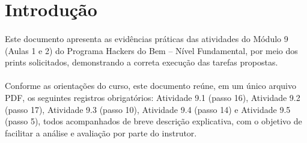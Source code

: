 \section{Introdução}

\paragraph{}
Este documento apresenta as evidências práticas das atividades do Módulo 9
(Aulas 1 e 2) do Programa Hackers do Bem -- Nível Fundamental, por meio dos
prints solicitados, demonstrando a correta execução das tarefas propostas.

\paragraph{}
Conforme as orientações do curso, este documento reúne, em um único arquivo
PDF, os seguintes registros obrigatórios: Atividade 9.1 (passo 16), Atividade
9.2 (passo 17), Atividade 9.3 (passo 10), Atividade 9.4 (passo 14) e Atividade
9.5 (passo 5), todos acompanhados de breve descrição explicativa, com o
objetivo de facilitar a análise e avaliação por parte do instrutor.
